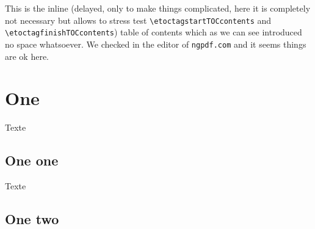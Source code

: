 \documentclass{article}
\begin{document}
\ifdefined\NOTAGGING\PackageError{JFBU}{ABORTING AS THIS REQUIRES TAGGING ON}{}\fi
\def\foo{}
\makeatletter
\let\protectededef\protected@edef
\let\protectedxdef\protected@xdef
\makeatother

   {\etocskipfirstprefix}
   {\protectedxdef\foo{\foo; }}
   {\protectedxdef\foo{\foo
                       \etocthetocitembegintag
                       \etoctagReference{\etocthelinkedname}%
                       \etocthetocitemendtag}%
    }
   {}

   {\protectedxdef\foo{\foo\space(}\etocskipfirstprefix}
   {\protectedxdef\foo{\foo, }}
   {\protectedxdef\foo{\foo
                       \etocthetocitembegintag
                       \etoctagReference{\etocthelinkedname}%
                       \etocthetocitemendtag}%
    }
   {\protectedxdef\foo{\foo)}}

\etocsettocstyle
   {\etoctaggingoff
    \gdef\foo{\etoctagstartTOCcontents}}
   {\protectedxdef\foo{\foo\etoctagfinishTOCcontents}}

\tableofcontents


This is the inline (delayed, only to make things complicated, here it is
completely not necessary but allows to stress test
\verb|\etoctagstartTOCcontents| and \verb|\etoctagfinishTOCcontents|)%
\foo
table of contents which as we can see introduced no space whatsoever.
We checked in the editor of \texttt{ngpdf.com} and it seems things are ok
here.

\section{One}

Texte

\subsection{One one}

Texte

\subsection{One two}
\end{document}
